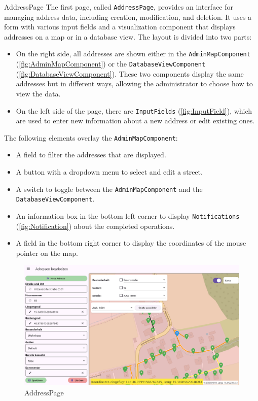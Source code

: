 \newpage

\begin{subsection}{AddressPage}
    \sloppy
    The first page, called \texttt{AddressPage}, provides an interface for managing address data, including creation, modification, and deletion. It uses a form with various input fields and a visualization component that displays addresses on a map or in a database view. The layout is divided into two parts:

    \begin{itemize}
        \item On the right side, all addresses are shown either in the \texttt{AdminMapComponent} (\ref{fig:AdminMapComponent}) or the \texttt{DatabaseViewComponent} (\ref{fig:DatabaseViewComponent}). These two components display the same addresses but in different ways, allowing the administrator to choose how to view the data.
        \item On the left side of the page, there are \texttt{InputFields} (\ref{fig:InputField}), which are used to enter new information about a new address or edit existing ones.
    \end{itemize}

    The following elements overlay the \texttt{AdminMapComponent}:

    \begin{itemize}
        \item A field to filter the addresses that are displayed.
        \item A button with a dropdown menu to select and edit a street.
        \item A switch to toggle between the \texttt{AdminMapComponent} and the \texttt{DatabaseViewComponent}.
        \item An information box in the bottom left corner to display \texttt{Notifications} (\ref{fig:Notification}) about the completed operations.
        \item A field in the bottom right corner to display the coordinates of the mouse pointer on the map.
    \end{itemize}
    

    \begin{figure}[H]
        \centering
        \includegraphics[width=1\linewidth]{images/AdminPanel/AddressPage.png}
        \caption{AddressPage}
    \end{figure}
\end{subsection}

